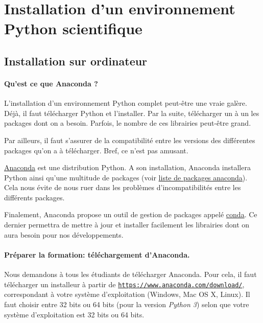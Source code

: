 \documentclass[%
oneside,                 %
final,                   %
10pt]{article}
\begin{document}
\noindent
\section{Installation d'un environnement Python scientifique}

\subsection{Installation sur ordinateur}

\paragraph{Qu’est ce que Anaconda ?}
L’installation d’un environnement Python complet peut-être une vraie galère. Déjà, il faut télécharger Python et l’installer. Par la suite, télécharger un à un les packages dont on a besoin. Parfois, le nombre de ces librairies peut-être grand.

Par ailleurs, il faut s’assurer de la compatibilité entre les versions des différentes packages qu’on a à télécharger. Bref, ce n’est pas amusant.

\href{{https://www.anaconda.com/download/}}{Anaconda} est  une distribution Python. A son installation, Anaconda installera Python ainsi qu'une multitude de packages (voir \href{{https://docs.anaconda.com/anaconda/packages/pkg-docs#python-3-6}}{liste de packages anaconda}).  Cela nous évite de nous ruer dans les problèmes d’incompatibilités entre les différents packages.

Finalement, Anaconda propose un outil de gestion de packages appelé \href{{https://conda.io/docs/}}{conda}. Ce dernier permettra de mettre à jour et installer facilement les librairies dont on aura besoin pour nos développements.

\paragraph{Préparer la formation: téléchargement d’Anaconda.}
Nous demandons à tous les étudiants de télécharger Anaconda. Pour cela, il faut télécharger un installeur à partir de \href{{https://www.anaconda.com/download/}}{\nolinkurl{https://www.anaconda.com/download/}}, correspondant à votre système d’exploitation (Windows, Mac OS X, Linux). Il faut choisir entre 32 bits ou 64 bits (pour la version \emph{Python 3}) selon que votre système d’exploitation est 32 bits ou 64 bits.
\end{document}
